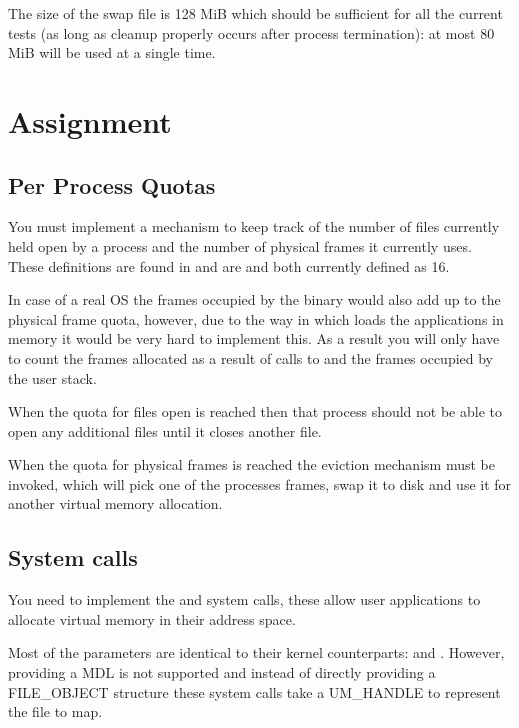 The size of the swap file is 128 MiB which should be sufficient for all the current tests (as long
as cleanup properly occurs after process termination): at most 80 MiB will be used at a single time.

\section{Assignment}

\subsection{Per Process Quotas}

You must implement a mechanism to keep track of the number of files currently held open by a process 
and the number of physical frames it currently uses. These definitions are found in 
and are  and  both currently
defined as 16.

In case of a real OS the frames occupied by the binary would also add up to the physical frame quota,
however, due to the way in which \projectname loads the applications in memory it would be very hard
to implement this. As a result you will only have to count the frames allocated as a result of calls
to  and the frames occupied by the user stack.

When the quota for files open is reached then that process should not be able to open any additional
files until it closes another file.

When the quota for physical frames is reached the eviction mechanism must be invoked, which will
pick one of the processes frames, swap it to disk and use it for another virtual memory allocation.

\subsection{System calls}

You need to implement the  and  system calls,
these allow user applications to allocate virtual memory in their address space.

Most of the parameters are identical to their kernel counterparts:  and
. However, providing a MDL is not supported and instead of directly providing
a FILE\_OBJECT structure these system calls take a UM\_HANDLE to represent the file to map.

